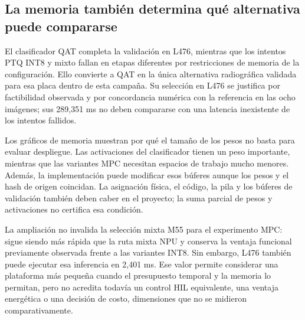 \subsection{La memoria también determina qué alternativa puede compararse}
El clasificador QAT completa la validación en L476, mientras que los intentos PTQ INT8 y mixto fallan en etapas diferentes por restricciones de memoria de la configuración. Ello convierte a QAT en la única alternativa radiográfica validada para esa placa dentro de esta campaña. Su selección en L476 se justifica por factibilidad observada y por concordancia numérica con la referencia en las ocho imágenes; sus 289,351 ms no deben compararse con una latencia inexistente de los intentos fallidos.

Los gráficos de memoria muestran por qué el tamaño de los pesos no basta para evaluar despliegue. Las activaciones del clasificador tienen un peso importante, mientras que las variantes MPC necesitan espacios de trabajo mucho menores. Además, la implementación puede modificar esos búferes aunque los pesos y el hash de origen coincidan. La asignación física, el código, la pila y los búferes de validación también deben caber en el proyecto; la suma parcial de pesos y activaciones no certifica esa condición.

La ampliación no invalida la selección mixta M55 para el experimento MPC: sigue siendo más rápida que la ruta mixta NPU y conserva la ventaja funcional previamente observada frente a las variantes INT8. Sin embargo, L476 también puede ejecutar esa inferencia en 2,401 ms. Ese valor permite considerar una plataforma más pequeña cuando el presupuesto temporal y la memoria lo permitan, pero no acredita todavía un control HIL equivalente, una ventaja energética o una decisión de costo, dimensiones que no se midieron comparativamente.

\FloatBarrier
